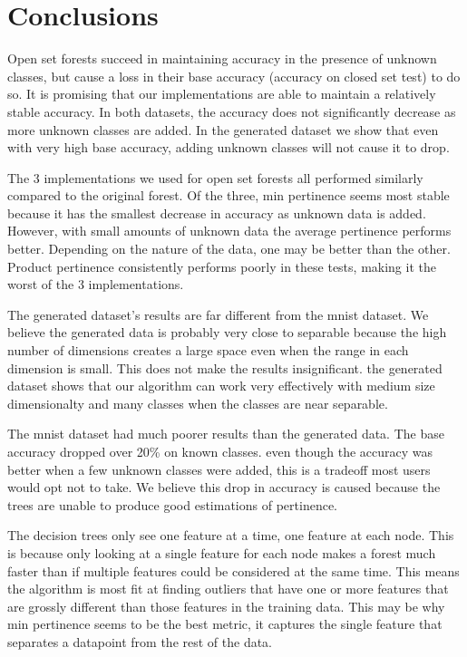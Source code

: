 \documentclass[conference]{IEEEtran}
\begin{document}
\section{Conclusions}

Open set forests succeed in maintaining accuracy in the presence of unknown classes, but cause a loss in their base accuracy (accuracy on closed set test) to do so.  It is promising that our implementations are able to maintain a relatively stable accuracy.  In both datasets, the accuracy does not significantly decrease as more unknown classes are added.  In the generated dataset we show that even with very high base accuracy, adding unknown classes will not cause it to drop.

The 3 implementations we used for open set forests all performed similarly compared to the original forest.  Of the three, min pertinence seems most stable because it has the smallest decrease in accuracy as unknown data is added.  However, with small amounts of unknown data the average pertinence performs better.  Depending on the nature of the data, one may be better than the other.  Product pertinence consistently performs poorly in these tests, making it the worst of the 3 implementations.

The generated dataset's results are far different from the mnist dataset.  We believe the generated data is probably very close to separable because the high number of dimensions creates a large space even when the range in each dimension is small.  This does not make the results insignificant.  the generated dataset shows that our algorithm can work very effectively with medium size dimensionalty and many classes when the classes are near separable.  

The mnist dataset had much poorer results than the generated data.  The base accuracy dropped over 20\% on known classes.  even though the accuracy was better when a few unknown classes were added, this is a tradeoff most users would opt not to take.  We believe this drop in accuracy is caused because the trees are unable to produce good estimations of pertinence.

The decision trees only see one feature at a time, one feature at each node.  This is because only looking at a single feature for each node makes a forest much faster than if multiple features could be considered at the same time.  This means the algorithm is most fit at finding outliers that have one or more features that are grossly different than those features in the training data.  This may be why min pertinence seems to be the best metric,  it captures the single feature that separates a datapoint from the rest of the data. 
\end{document}
